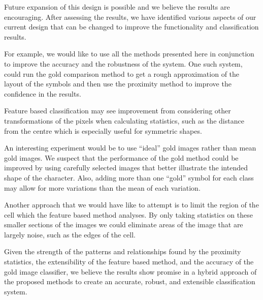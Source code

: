 Future expansion of this design is possible and we believe the results are encouraging.
After assessing the results, we have identified various aspects of our current design
that can be changed to improve the functionality and classification results.

For example, we would like to use all the methods presented here
in conjunction to improve the accuracy and the robustness of the system.
One such system, could run the gold comparison method to get a rough approximation of the layout of the
symbols and then use the proximity method to improve the confidence in the results.

Feature based classification may see improvement from considering other
transformations of the pixels when calculating statistics, such as the distance
from the centre which is especially useful for symmetric shapes.

An interesting experiment would be to use ``ideal'' gold images rather
than mean gold images. We suspect that the performance of the gold method could be
improved by using carefully selected images that better illustrate the intended
shape of the character. Also, adding more than one ``gold'' symbol for each class
may allow for more variations than the mean of each variation.

Another approach that we would have like to attempt is to limit the region 
of the cell which the feature based method analyses.
By only taking statistics on these smaller
sections of the images we could eliminate areas of the image that are largely
noise, such as the edges of the cell.

Given the strength of the patterns and relationships found by the proximity
statistics, the extensibility of the feature based method, and the accuracy of
the gold image classifier, we believe the results show promise in a hybrid approach of the proposed
methods to create an accurate, robust, and extensible classification system.
